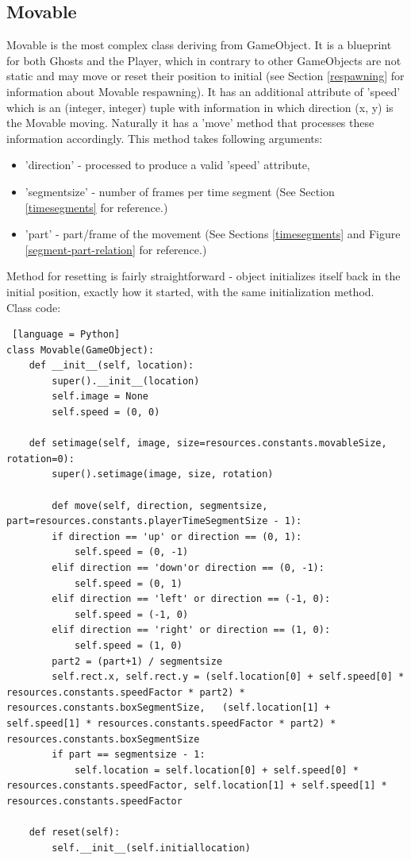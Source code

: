 \documentclass[11pt,a4paper]{report}
\begin{document}
			\subsection{Movable}
				Movable is the most complex class deriving from GameObject. It is a blueprint for both Ghosts and the Player, which in contrary to other GameObjects are not static and may move or reset their position to initial (see Section \ref{respawning} for information about Movable respawning).
				It has an additional attribute of 'speed' which is an (integer, integer) tuple with information in which direction (x, y) is the Movable moving. Naturally it has a 'move' method that processes these information accordingly. This method takes following arguments:
				\begin{itemize}
					\item
						'direction' - processed to produce a valid 'speed' attribute,
					\item
						'segmentsize' - number of frames per time segment (See Section \ref{timesegments} for reference.)
					\item
						'part' - part/frame of the movement (See Sections \ref{timesegments} and Figure \ref{segment-part-relation} for reference.)
				\end{itemize}
				Method for resetting is fairly straightforward - object initializes itself back in the initial position, exactly how it started, with the same initialization method.\\
				Class code:
				\begin{lstlisting} [language = Python]
class Movable(GameObject):
	def __init__(self, location):
		super().__init__(location)
		self.image = None
		self.speed = (0, 0)
		
	def setimage(self, image, size=resources.constants.movableSize, rotation=0):
		super().setimage(image, size, rotation)
	
		def move(self, direction, segmentsize, part=resources.constants.playerTimeSegmentSize - 1):
		if direction == 'up' or direction == (0, 1):
			self.speed = (0, -1)
		elif direction == 'down'or direction == (0, -1):
			self.speed = (0, 1)
		elif direction == 'left' or direction == (-1, 0):
			self.speed = (-1, 0)
		elif direction == 'right' or direction == (1, 0):
			self.speed = (1, 0)
		part2 = (part+1) / segmentsize
		self.rect.x, self.rect.y = (self.location[0] + self.speed[0] * resources.constants.speedFactor * part2) * resources.constants.boxSegmentSize,	(self.location[1] + self.speed[1] * resources.constants.speedFactor * part2) * resources.constants.boxSegmentSize
		if part == segmentsize - 1:
			self.location = self.location[0] + self.speed[0] * resources.constants.speedFactor, self.location[1] + self.speed[1] * resources.constants.speedFactor
	
	def reset(self):
		self.__init__(self.initiallocation)
				\end{lstlisting}
\end{document}
